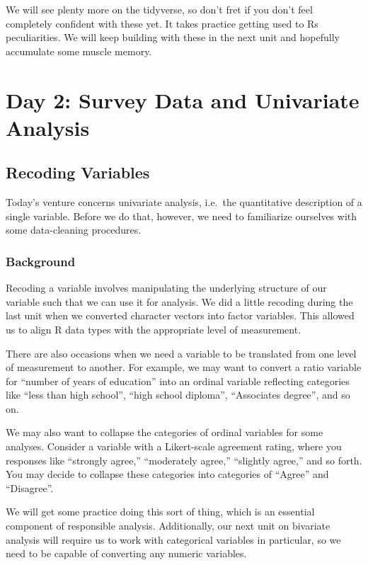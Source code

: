 \documentclass[
  letterpaper,
  DIV=11,
  numbers=noendperiod]{scrreprt}
\begin{document}
We will see plenty more on the tidyverse, so don't fret if you don't
feel completely confident with these yet. It takes practice getting used
to Rs peculiarities. We will keep building with these in the next unit
and hopefully accumulate some muscle memory.

\part{Day 2: Survey Data and Univariate Analysis}

\chapter{Recoding Variables}\label{recoding-variables}

Today's venture concerns univariate analysis, i.e.~the quantitative
description of a single variable. Before we do that, however, we need to
familiarize ourselves with some data-cleaning procedures.

\section{Background}\label{background-1}

Recoding a variable involves manipulating the underlying structure of
our variable such that we can use it for analysis. We did a little
recoding during the last unit when we converted character vectors into
factor variables. This allowed us to align R data types with the
appropriate level of measurement.

There are also occasions when we need a variable to be translated from
one level of measurement to another. For example, we may want to convert
a ratio variable for ``number of years of education'' into an ordinal
variable reflecting categories like ``less than high school'', ``high
school diploma'', ``Associates degree'', and so on.

We may also want to collapse the categories of ordinal variables for
some analyses. Consider a variable with a Likert-scale agreement rating,
where you responses like ``strongly agree,'' ``moderately agree,''
``slightly agree,'' and so forth. You may decide to collapse these
categories into categories of ``Agree'' and ``Disagree''.

We will get some practice doing this sort of thing, which is an
essential component of responsible analysis. Additionally, our next unit
on bivariate analysis will require us to work with categorical variables
in particular, so we need to be capable of converting any numeric
variables.
\end{document}
